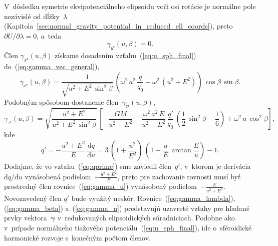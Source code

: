 \documentclass[a4paper, 12pt]{book}
\newcommand{\diff}{\mathrm d}
\begin{document}
V~dôsledku symetrie ekvipotenciálneho elipsoidu voči osi rotácie je normálne 
pole nezávislé od dĺžky~$\lambda$ 
(Kapitola~\ref{sec:normal_gravity_potential_in_reduced_ell_coords}), 
preto~$\partial U \slash \partial \lambda = 0$, a~teda
%
\begin{equation}
\label{eq:gamma_lambda}
\gamma_{y^\mathrm{r}}(u, \beta) = 0{.}
\end{equation}
%
Člen $\gamma_{x^\mathrm{r}}(u, \beta)$ získame dosadením 
vzťahu~(\ref{eq:u_sph_final}) do~(\ref{eq:gamma_vec_general}),
%
\begin{equation}
\label{eq:gamma_beta}
\gamma_{x^\mathrm{r}}(u, \beta) = \frac{1}{\sqrt{u^2 + E^2 \, \sin^2\beta}} \, 
\left( \omega^2 \, a^2 \, \frac{q}{q_0} - \omega^2 \, (u^2 + E^2) \right) \, 
\cos\beta \, \sin\beta{.}
\end{equation}
%
Podobným spôsobom dostaneme člen~$\gamma_{z^\mathrm{r}}(u, \beta)$,
%
\begin{equation}
\label{eq:gamma_u}
\gamma_{z^\mathrm{r}}(u, \beta) = \sqrt{\dfrac{u^2 + E^2}{u^2 + E^2 \, 
\sin^2\beta}} \, \left[ -\frac{GM}{u^2 + E^2} - \frac{\omega^2 \, a^2 \, E}{u^2 
+ E^2} \, \frac{q'}{q_0} \, \left( \frac{1}{2} \, \sin^2\beta - \frac{1}{6} 
\right) + \omega^2 \, u \, \cos^2\beta \right]{,}
\end{equation}
%
kde \parencite{MoritzPhysicalGeodesy}
%
\begin{equation}
\label{eq:qprime}
q' = -\frac{u^2 + E^2}{E} \, \frac{\diff q}{\diff u} = 3 \, \left( 
1 + \frac{u^2}{E^2} \right) \, \left(  1 - \frac{u}{E} \, \arctan\frac{E}{u} 
\right) - 1{.}
\end{equation}
%
Dodajme, že vo vzťahu~(\ref{eq:qprime}) sme zaviedli člen~$q'$, v~ktorom je 
derivácia~$\diff q \slash \diff u$ vynásobená podielom~$-\frac{u^2 + E^2}{E}$, 
preto pre zachovanie rovnosti musí byť prostredný člen 
rovnice~(\ref{eq:gamma_u}) vynásobený podielom~$-\frac{E}{u^2 + E^2}$.  
Novozavedený člen $q'$ bude využitý neskôr.  Rovnice~(\ref{eq:gamma_lambda}), 
(\ref{eq:gamma_beta}) a~(\ref{eq:gamma_u}) predstavujú uzavreté vzťahy pre 
hľadané prvky vektora~$\boldsymbol \gamma$ v~redukovaných elipsoidických 
súradniciach.  Podobne ako v~prípade normálneho tiažového 
potenciálu~(\ref{eq:u_sph_final}), ide o~sféroidické harmonické rozvoje 
s~konečným počtom členov.
\end{document}
